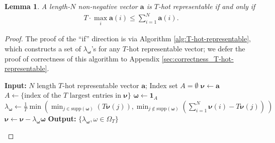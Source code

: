 \documentclass[11pt,letterpaper]{article}
\newtheorem{lemma}{\textbf{Lemma}}
\newcommand{\supp}{\mathrm{supp}}
\begin{document}
\begin{lemma}\label{lemma:T-hot-representable-criterion} 
     A length-$N$ non-negative vector $\boldsymbol{a}$ is $T$-hot representable if and only if  
    \begin{align}
        T \cdot \max_i \boldsymbol{a}(i) \leq \sum_{i = 1}^N \boldsymbol{a}(i).\label{eq:T-hot-representable}
    \end{align}
\end{lemma}
\begin{proof}
    The proof of the ``if” direction is via Algorithm \ref{alg:T-hot-representable}, which constructs a set of $\lambda_{\boldsymbol{\omega}}$'s for any $T$-hot representable vector; we defer the proof of correctness of this algorithm to Appendix \ref{sec:correctness_T-hot-representable}.

\begin{algorithm}[h]
\caption{$T$-hot representable}
\label{alg:T-hot-representable}
\begin{algorithmic}[1]
\State \textbf{Input:} $N$ length $T$-hot representable vector $\boldsymbol{a}$; Index set $A = \emptyset $
\State $\boldsymbol{\nu} \gets \boldsymbol{a}$
    \State $A \gets \{ \text{index of the $T$ largest entries in } \boldsymbol{\nu} \}$
    \State $\boldsymbol{\omega} \gets \mathbf{1}_A$
    \State $\lambda_{\boldsymbol{\omega}} \gets \frac{1}{T}\min \left( \min_{j \in \supp(\boldsymbol{\omega})} \left( T \boldsymbol{\nu}(j)\right)  ,\min_{j\notin \supp(\boldsymbol{\omega})} \left( \sum^{N}_{i=1} \boldsymbol{\nu}(i)-T \boldsymbol{\nu}(j)\right)  \  \right)$ \label{alg-eq:lambda}
    \State $\boldsymbol{\nu} \gets \boldsymbol{\nu} - \lambda_{\boldsymbol{\omega}}\boldsymbol{\omega}$ \label{alg-eq:update_v}
\EndWhile
\State \textbf{Output:} $\{\lambda_{\boldsymbol{\omega}}, \omega\in \Omega_T\}$
\end{algorithmic}
\end{algorithm}
    
    
    

\end{proof}
\end{document}

